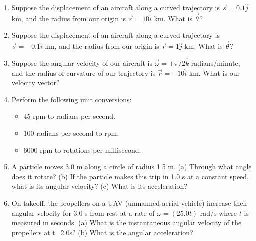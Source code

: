 \documentclass{article}
\begin{document}
\begin{enumerate}
\item Suppose the displacement of an aircraft along a curved trajectory is $\vec{s} = 0.1 \hat{j}$ km, and the radius from our origin is $\vec{r} = 10 \hat{i}$ km. What is $\vec{\theta}$? \\ \vspace{1cm}
\item Suppose the displacement of an aircraft along a curved trajectory is $\vec{s} = -0.1 \hat{i}$ km, and the radius from our origin is $\vec{r} = 1 \hat{j}$ km. What is $\vec{\theta}$? \\ \vspace{1cm}
\item Suppose the angular velocity of our aircraft is $\vec{\omega} = + \pi/2 \hat{k}$ radians/minute, and the radius of curvature of our trajectory is $\vec{r} = -10\hat{i}$ km.  What is our velocity vector? \\ \vspace{1cm}
\item Perform the following unit conversions:
\begin{itemize}
\item 45 rpm to radians per second.
\item 100 radians per second to rpm.
\item 6000 rpm to rotations per millisecond.
\end{itemize} \vspace{2cm}
\item A particle moves 3.0 m along a circle of radius 1.5 m. (a) Through what angle does it rotate? (b) If the particle makes this trip in 1.0 s at a constant speed, what is its angular velocity? (c) What is its acceleration? \\ \vspace{2cm} 
\item  On takeoff, the propellers on a UAV (unmanned aerial vehicle) increase their angular velocity for 3.0 s from rest at a rate of $\omega=(25.0t)$ rad/s where $t$ is measured in seconds. (a) What is the instantaneous angular velocity of the propellers at t=2.0s? (b) What is the angular acceleration?
\end{enumerate}
\end{document}
